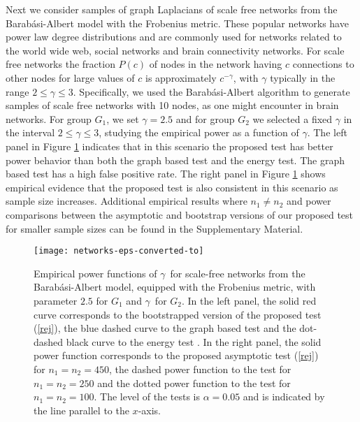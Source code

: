 \documentclass[lineno]{biometrika}
\def\cp{\citep}
\def\cp{\citep}
\begin{document}
Next we consider samples of graph Laplacians of scale free networks from the Barab\'{a}si-Albert model with the Frobenius metric. These popular networks have power law degree distributions and are commonly used for networks related to the world wide web, social networks and  brain connectivity networks. For scale free networks the fraction $P(c)$ of nodes in the network having $c$ connections to other nodes for large values of $c$ is approximately $c^{-\gamma}$, 
with $\gamma$ typically in the range $2 \leq \gamma \leq 3$. Specifically, we used the Barab\'{a}si-Albert algorithm to generate samples of scale free networks with 10 nodes, as one might encounter in brain networks.  For group $G_1$, we set $\gamma=2.5$ and for group $G_2$ we selected a fixed  $\gamma$ in the interval $2 \leq \gamma \leq 3$, studying the empirical power as a function of  
$\gamma$. The left panel in Figure \ref{fig: fig_4} indicates that in this scenario the proposed test has better power behavior  than both the graph based test and the energy test. The graph based test has a high false positive rate. The right panel in Figure \ref{fig: fig_4} shows empirical evidence  that the proposed  test is also consistent in this scenario as  sample size increases. {Additional empirical results where $n_1 \neq n_2$ and power comparisons between the asymptotic and bootstrap versions of our proposed test for smaller sample sizes can be found in the Supplementary Material.}
\begin{figure}
	\centering
		\texttt{[image: networks-eps-converted-to]}
		\caption{Empirical power functions of  $\gamma\,$ for  scale-free networks from the Barab\'{a}si-Albert model, {equipped with the Frobenius metric}, with parameter $2.5$ for $G_1$ and $\gamma\,$ for $G_2$. In the left panel, the solid red curve corresponds to the bootstrapped version of  the proposed test (\ref{rej}), the blue dashed curve to the graph based test \cp{chen:16} and the dot-dashed black curve to the energy test \cp{szek:04}. %
		In the right panel, the solid power function  corresponds to the proposed asymptotic test (\ref{rej}) for $n_1=n_2=450$, the dashed power function  to the test for $n_1=n_2=250$ and the dotted power function  to the test for $n_1=n_2=100$. The level of the tests is $\alpha= 0.05$ and is indicated by the line parallel to the $x$-axis.} %
		\label{fig: fig_4}
\end{figure}
\end{document}
